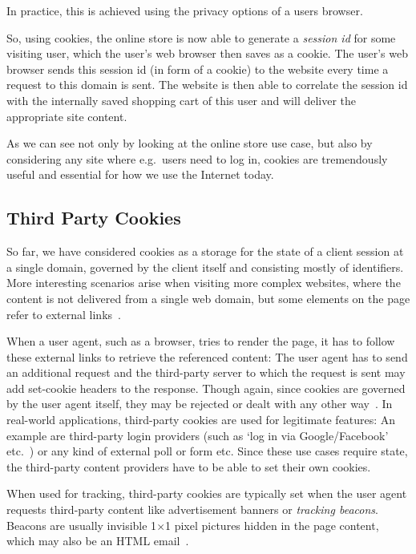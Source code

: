In practice, this is achieved using the privacy options of a users browser.\par
So, using cookies, the online store is now able to generate a \textit{session id} for some visiting user, which the user's web browser then saves as a cookie.
The user's web browser sends this session id (in form of a cookie) to the website every time a request to this domain is sent.
The website is then able to correlate the session id with the internally saved shopping cart of this user and will deliver the appropriate site content.\par
As we can see not only by looking at the online store use case, but also by considering any site where e.g.\ users need to log in, cookies are tremendously useful and essential for how we use the Internet today.

\subsection{Third Party Cookies}\label{section:third-party-cookies}
So far, we have considered cookies as a storage for the state of a client session at a single domain,
governed by the client itself and consisting mostly of identifiers.
More interesting scenarios arise when visiting more complex websites, where the content is not delivered from a single web domain,
but some elements on the page refer to external links~.

When a user agent, such as a browser, tries to render the page, it has to follow these external links to retrieve the referenced content:
The user agent has to send an additional request and the third-party server to which the request is sent may add set-cookie headers to the response.
Though again, since cookies are governed by the user agent itself, they may be rejected or dealt with any other way~\cite[Section~5.2,~Section~7.1]{RFC6265}.
In real-world applications, third-party cookies are used for legitimate features:
An example are third-party login providers (such as `log in via Google/Facebook' etc.~) or any kind of external poll or form etc.
Since these use cases require state, the third-party content providers have to be able to set their own cookies.

When used for tracking, third-party cookies are typically set when the user agent requests third-party content like advertisement banners or \textit{tracking beacons}.
Beacons are usually invisible 1$\times$1 pixel pictures hidden in the page content, which may also be an HTML email~.
